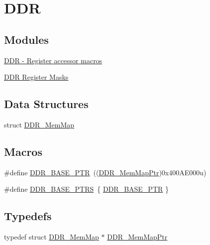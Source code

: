 \hypertarget{group___d_d_r___peripheral}{}\section{D\+D\+R}
\label{group___d_d_r___peripheral}
\subsection*{Modules}
\begin{DoxyCompactItemize}
\item 
\hyperlink{group___d_d_r___register___accessor___macros}{D\+D\+R -\/ Register accessor macros}
\item 
\hyperlink{group___d_d_r___register___masks}{D\+D\+R Register Masks}
\end{DoxyCompactItemize}
\subsection*{Data Structures}
\begin{DoxyCompactItemize}
\item 
struct \hyperlink{struct_d_d_r___mem_map}{D\+D\+R\+\_\+\+Mem\+Map}
\end{DoxyCompactItemize}
\subsection*{Macros}
\begin{DoxyCompactItemize}
\item 
\#define \hyperlink{group___d_d_r___peripheral_ga6be9f9ecee4c870709dbf1d87708b205}{D\+D\+R\+\_\+\+B\+A\+S\+E\+\_\+\+P\+T\+R}~((\hyperlink{group___d_d_r___peripheral_gac9d35670854682dcae0e5ee573ce6144}{D\+D\+R\+\_\+\+Mem\+Map\+Ptr})0x400\+A\+E000u)
\item 
\#define \hyperlink{group___d_d_r___peripheral_gad0f00467c6ba2adc2a6b7b8d501f7405}{D\+D\+R\+\_\+\+B\+A\+S\+E\+\_\+\+P\+T\+R\+S}~\{ \hyperlink{group___d_d_r___peripheral_ga6be9f9ecee4c870709dbf1d87708b205}{D\+D\+R\+\_\+\+B\+A\+S\+E\+\_\+\+P\+T\+R} \}
\end{DoxyCompactItemize}
\subsection*{Typedefs}
\begin{DoxyCompactItemize}
\item 
typedef struct \hyperlink{struct_d_d_r___mem_map}{D\+D\+R\+\_\+\+Mem\+Map} $\ast$ \hyperlink{group___d_d_r___peripheral_gac9d35670854682dcae0e5ee573ce6144}{D\+D\+R\+\_\+\+Mem\+Map\+Ptr}
\end{DoxyCompactItemize}


